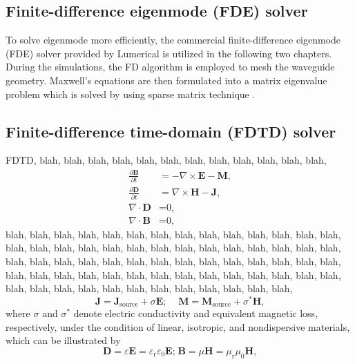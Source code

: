 \subsection{Finite-difference eigenmode (FDE) solver} \label{sec:2.4.3}
    To solve eigenmode more efficiently, 
    the commercial finite-difference eigenmode (FDE) solver provided by Lumerical is utilized in the following two chapters. 
    During the simulations, 
    the FD algorithm is employed to mesh the waveguide geometry. 
    Maxwell's equations are then formulated into a matrix eigenvalue problem
    which is solved by using sparse matrix technique \cite{lu-fde, fde-oe}. 

\subsection{Finite-difference time-domain (FDTD) solver} \label{sec:2.4.4}
    FDTD, blah, blah, blah, blah, blah, blah, blah, blah, blah, blah, blah, blah, 
    \begin{align}
        \frac{\partial\textbf{B}}{\partial t} &= -\nabla\times\textbf{E} - \textbf{M}\text{,}\label{eq:ME1}\\
        \frac{\partial\textbf{D}}{\partial t} &= \nabla\times\textbf{H}-\textbf{J}\text{,}\label{eq:ME2}\\
        \nabla\cdot\textbf{D} &= \text{0}\text{,}\label{eq:ME3}\\
        \nabla\cdot\textbf{B} &= \text{0}\text{,}\label{eq:ME4}
    \end{align}
    blah, blah, blah, blah, blah, blah, blah, blah, blah, blah, blah, blah, blah, blah, blah, blah, blah, 
    blah, blah, blah, blah, blah, blah, blah, blah, blah, blah, blah, blah, blah, blah, blah, blah, blah, 
    blah, blah, blah, blah, blah, blah, blah, blah, blah, blah, blah, blah, blah, blah, blah, blah, blah, 
    blah, blah, blah, blah, blah, blah, blah, blah, blah, blah, blah, blah, blah, blah, blah, blah, blah, 
    \begin{equation}
        \textbf{J} = \textbf{J}_\text{source}+\sigma \textbf{E};\;\;\;\;
        \textbf{M} = \textbf{M}_\text{source}+\sigma^* \textbf{H}\text{,}\label{eq:JM}
    \end{equation}
    where $\sigma$ and $\sigma^*$ denote electric conductivity and equivalent magnetic loss, respectively, 
    under the condition of linear, isotropic, and nondispersive materials, which can be illustrated by 
    \begin{equation}
        \textbf{D} = \varepsilon\textbf{E} = \varepsilon_\text{r}\varepsilon_\text{0} \textbf{E}\text{;} \;
        \textbf{B} = \mu\textbf{H} = \mu_\text{r}\mu_\text{0}\textbf{H}\text{,}\label{eq:DB}
    \end{equation}
